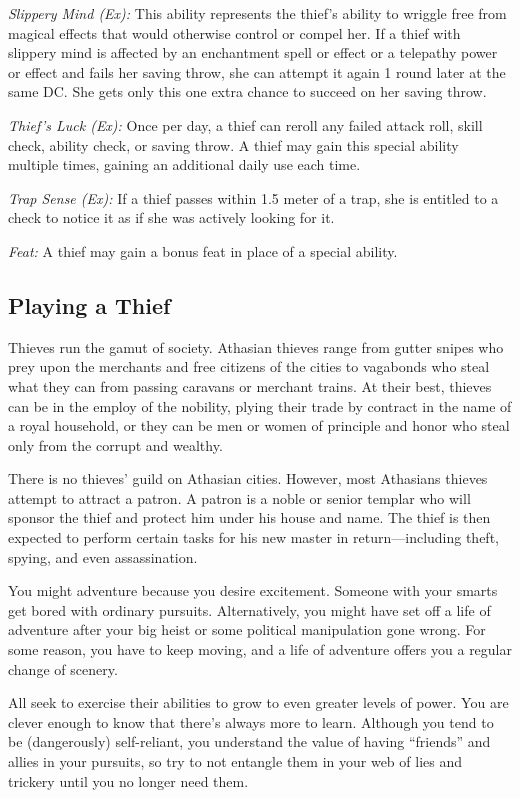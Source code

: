 \textit{Slippery Mind (Ex):} This ability represents the thief's ability to wriggle free from magical effects that would otherwise control or compel her. If a thief with slippery mind is affected by an enchantment spell or effect or a telepathy power or effect and fails her saving throw, she can attempt it again 1 round later at the same DC. She gets only this one extra chance to succeed on her saving throw.

\textit{Thief's Luck (Ex):} Once per day, a thief can reroll any failed attack roll, skill check, ability check, or saving throw. A thief may gain this special ability multiple times, gaining an additional daily use each time.

\textit{Trap Sense (Ex):} If a thief passes within 1.5 meter of a trap, she is entitled to a  check to notice it as if she was actively looking for it.

\textit{Feat:} A thief may gain a bonus feat in place of a special ability.

\subsection{Playing a Thief}
Thieves run the gamut of society. Athasian thieves range from gutter snipes who prey upon the merchants and free citizens of the cities to vagabonds who steal what they can from passing caravans or merchant trains. At their best, thieves can be in the employ of the nobility, plying their trade by contract in the name of a royal household, or they can be men or women of principle and honor who steal only from the corrupt and wealthy.

There is no thieves' guild on Athasian cities. However, most Athasians thieves attempt to attract a patron. A patron is a noble or senior templar who will sponsor the thief and protect him under his house and name. The thief is then expected to perform certain tasks for his new master in return---including theft, spying, and even assassination.

You might adventure because you desire excitement. Someone with your smarts get bored with ordinary pursuits. Alternatively, you might have set off a life of adventure after your big heist or some political manipulation gone wrong. For some reason, you have to keep moving, and a life of adventure offers you a regular change of scenery.

All seek to exercise their abilities to grow to even greater levels of power. You are clever enough to know that there's always more to learn. Although you tend to be (dangerously) self-reliant, you understand the value of having ``friends'' and allies in your pursuits, so try to not entangle them in your web of lies and trickery until you no longer need them.

